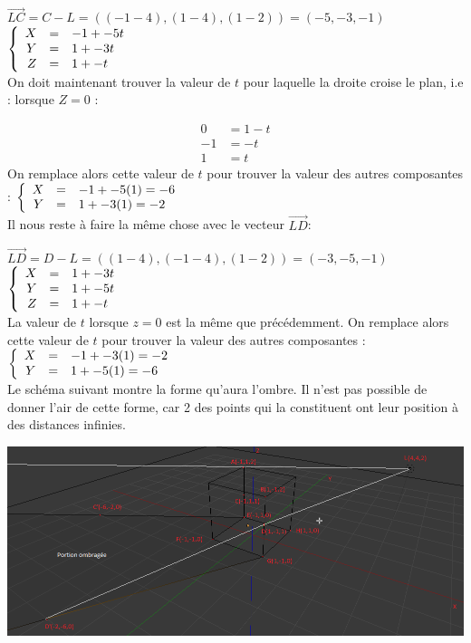 \documentclass[12pt,addpoints]{exam}
\begin{document}
\begin{questions}
\begin{solution}
$\vec{LC} = C - L = ( (-1 - 4) , (1-4) , (1-2) ) = (-5,-3,-1)$\\
$
\left \{
   \begin{array}{r c l}
      X & = & -1 + -5t \\
      Y & = & 1 + -3t \\
      Z & = & 1 + -t
   \end{array}
\right .
$\\
On doit maintenant trouver la valeur de $t$ pour laquelle la droite croise le plan, i.e : lorsque $Z = 0$ : 

\begin{align*} 
0 & = 1 - t \\
-1 & = -t \\ 
1 & = t 
\end{align*}
\newline
On remplace alors cette valeur de $t$ pour trouver la valeur des autres composantes : 
$
\left \{
   \begin{array}{r c l}
      X & = & -1 + -5(1) = -6\\
      Y & = & 1 + -3(1) =  -2
   \end{array}
\right .
$\\
\newpage
Il nous reste à faire la même chose avec le vecteur $\vec{LD}$: 

$\vec{LD} = D - L = ( (1 - 4) , (-1-4) , (1-2) ) = (-3,-5,-1)$\\
$
\left \{
   \begin{array}{r c l}
      X & = & 1 + -3t \\
      Y & = & 1 + -5t \\
      Z & = & 1 + -t
   \end{array}
\right .
$\\
La valeur de $t$ lorsque $z = 0$ est la même que précédemment.
On remplace alors cette valeur de $t$ pour trouver la valeur des autres composantes : \\
$
\left \{
   \begin{array}{r c l}
      X & = & -1 + -3(1) = -2\\
      Y & = & 1 + -5(1) =  -6
   \end{array}
\right .
$\\
Le schéma suivant montre la forme qu'aura l'ombre. Il n'est pas possible de donner l'air de cette forme, car 2 des points qui la constituent ont leur position à des distances infinies.

\begin{center} \includegraphics[width=1\linewidth]{images/q5.png} \end{center}
\end{solution}

\end{questions}
\end{document}
